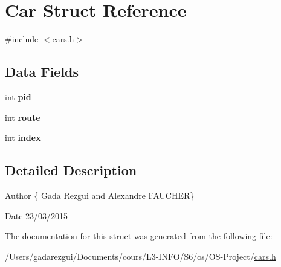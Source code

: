 \hypertarget{struct_car}{}\section{Car Struct Reference}
\label{struct_car}


{\ttfamily \#include $<$cars.\+h$>$}

\subsection*{Data Fields}
\begin{DoxyCompactItemize}
\item 
\hypertarget{struct_car_af500917c052066b40cf47f96b43c607b}{}int {\bfseries pid}\label{struct_car_af500917c052066b40cf47f96b43c607b}

\item 
\hypertarget{struct_car_a882872953fb42de6e7f35d22d1b9e3e1}{}int {\bfseries route}\label{struct_car_a882872953fb42de6e7f35d22d1b9e3e1}

\item 
\hypertarget{struct_car_a750b5d744c39a06bfb13e6eb010e35d0}{}int {\bfseries index}\label{struct_car_a750b5d744c39a06bfb13e6eb010e35d0}

\end{DoxyCompactItemize}


\subsection{Detailed Description}
\begin{DoxyAuthor}{Author}
\{ Gada Rezgui and Alexandre F\+A\+U\+C\+H\+E\+R\} 
\end{DoxyAuthor}
\begin{DoxyDate}{Date}
23/03/2015 
\end{DoxyDate}


The documentation for this struct was generated from the following file\+:\begin{DoxyCompactItemize}
\item 
/\+Users/gadarezgui/\+Documents/cours/\+L3-\/\+I\+N\+F\+O/\+S6/os/\+O\+S-\/\+Project/\hyperlink{cars_8h}{cars.\+h}\end{DoxyCompactItemize}
